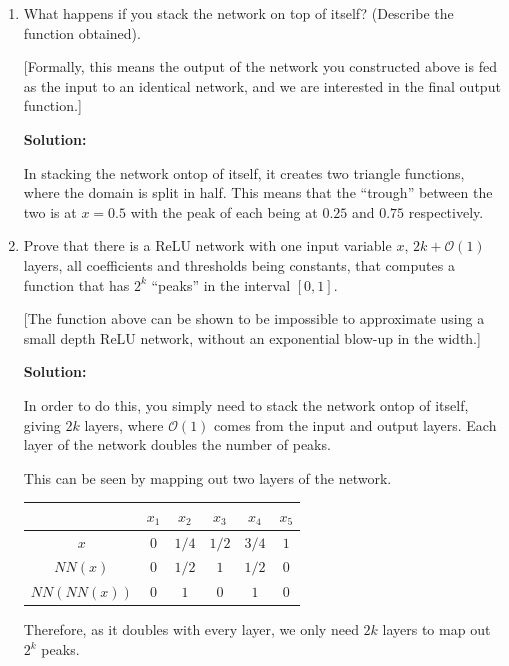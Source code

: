 \documentclass[12pt]{article}
\newcommand{\BigO}[1]{\mathcal{O}\left( #1 \right)}
\begin{document}
\begin{enumerate}
\begin{enumerate}
   {\bf Solution:}

\item What happens if you stack the network on top of itself? (Describe the function obtained). 

[Formally, this means the output of the network you constructed above is fed as the input to an identical network, and we are interested in the final output function.]

   {\bf Solution:}

In stacking the network ontop of itself, it creates two triangle functions, where the domain is split in half. This means that the ``trough'' between the two is at $x = 0.5$ with the peak of each being at $0.25$ and $0.75$ respectively. 

\item Prove that there is a ReLU network with one input variable $x$, $2k + \BigO{1}$ layers, all coefficients and thresholds being constants, that computes a function that has $2^{k}$ ``peaks'' in the interval $[0,1]$.

[The function above can be shown to be impossible to approximate using a small depth ReLU network, without an exponential blow-up in the width.]

   {\bf Solution:}

In order to do this, you simply need to stack the network ontop of itself, giving $2k$ layers, where $\BigO{1}$ comes from the input and output layers. Each layer of the network doubles the number of peaks.

This can be seen by mapping out two layers of the network.

\begin{table}[H]
\centering
\begin{tabular}{c | c c c c c}
\hline\hline
 & $x_{1}$ & $x_{2}$ & $x_{3}$ & $x_{4}$ & $x_{5}$\\
\hline
$x$ & $0$ & $1/4$ & $1/2$ & $3/4$ & $1$\\
$NN(x)$ & $0$ & $1/2$ & $1$ & $1/2$ & $0$\\
$NN(NN(x))$ & $0$ & $1$ & $0$ & $1$ & $0$\\
\hline
\end{tabular}
\end{table}

Therefore, as it doubles with every layer, we only need $2k$ layers to map out $2^{k}$ peaks.


\end{enumerate}

\newpage


\end{enumerate}
\end{document}
